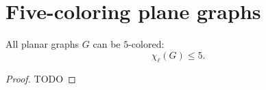 \chapter{Five-coloring plane graphs}

\begin{theorem}
  \label{five_colorable}
  All planar graphs $G$ can be $5$-colored:
  \[
  \chi_{\ell}(G)\le 5.
  \]
\end{theorem}
\begin{proof}
  TODO
\end{proof}
